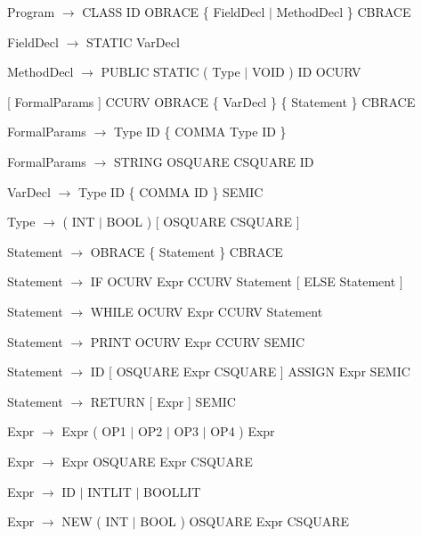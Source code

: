 \documentclass[11pt,a4paper]{article}
\begin{document}
\hspace{-1cm}Program $\rightarrow$ CLASS ID OBRACE \{ FieldDecl $\mid$ MethodDecl \} CBRACE

\hspace{-1cm}FieldDecl $\rightarrow$ STATIC VarDecl

\hspace{-1cm}MethodDecl $\rightarrow$ PUBLIC STATIC ( Type $\mid$ VOID ) ID OCURV

\hspace{-.5cm}[ FormalParams ] CCURV OBRACE \{ VarDecl \} \{ Statement \} CBRACE

\hspace{-1cm}FormalParams $\rightarrow$ Type ID \{ COMMA Type ID \}

\hspace{-1cm}FormalParams $\rightarrow$ STRING OSQUARE CSQUARE ID

\hspace{-1cm}VarDecl $\rightarrow$ Type ID \{ COMMA ID \} SEMIC

\hspace{-1cm}Type $\rightarrow$ ( INT $\mid$ BOOL ) [ OSQUARE CSQUARE ]

\hspace{-1cm}Statement $\rightarrow$ OBRACE \{ Statement \} CBRACE

\hspace{-1cm}Statement $\rightarrow$ IF OCURV Expr CCURV Statement [ ELSE Statement ]

\hspace{-1cm}Statement $\rightarrow$ WHILE OCURV Expr CCURV Statement

\hspace{-1cm}Statement $\rightarrow$ PRINT OCURV Expr CCURV SEMIC

\hspace{-1cm}Statement $\rightarrow$ ID [ OSQUARE Expr CSQUARE ] ASSIGN Expr SEMIC

\hspace{-1cm}Statement $\rightarrow$ RETURN [ Expr ] SEMIC

\hspace{-1cm}Expr $\rightarrow$ Expr ( OP1 $\mid$ OP2 $\mid$ OP3 $\mid$ OP4 ) Expr

\hspace{-1cm}Expr $\rightarrow$ Expr OSQUARE Expr CSQUARE

\hspace{-1cm}Expr $\rightarrow$ ID $\mid$ INTLIT $\mid$ BOOLLIT

\hspace{-1cm}Expr $\rightarrow$ NEW ( INT $\mid$ BOOL ) OSQUARE Expr CSQUARE
\end{document}
